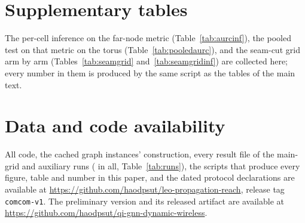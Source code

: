 \documentclass[preprint,11pt,3p]{elsarticle}
\begin{document}
\appendix
\section{Supplementary tables}
\label{app:tables}
The per-cell inference on the far-node metric (Table~\ref{tab:aurcinf}), the pooled test on that
metric on the torus (Table~\ref{tab:pooledaurc}), and the seam-cut grid arm by arm
(Tables~\ref{tab:seamgrid} and~\ref{tab:seamgridinf}) are collected here; every number in them is
produced by the same script as the tables of the main text.

\begin{table}[H]
\centering
\caption{Grid 2, far-node error at 1000 epochs, submitted capacity: paired inference across
seeds for each arm-level cell, with the same columns as Table~\ref{tab:grid3inf}: mean per-seed
difference $e_{\mathrm{heat}}-e_{\mathrm{walk}}$ on the far-node metric with its 95\% bootstrap
interval, exact sign-test $p$, exact Wilcoxon $p$, and the Wilcoxon $p$ Holm-corrected over the
\numGthreeArmCells{} cells of this table; the constant predictor for each cell is in
Table~\ref{tab:aurc}. The pooled form of rule~6 on this metric is in Table~\ref{tab:pooledaurc}.}
\label{tab:aurcinf}

\end{table}

\begin{table}[H]
\centering
\caption{Grid 2, far-node error: the pooled form of rule~6, one test per (task, shell), with
the columns of Table~\ref{tab:pooled}.}
\label{tab:pooledaurc}

\end{table}

\begin{table}[H]
\centering
\caption{Seam-cut graph, MAE at 1000 epochs, submitted capacity, every $t$ arm, with the columns
of Table~\ref{tab:grid3}.}
\label{tab:seamgrid}

\end{table}

\begin{table}[H]
\centering
\caption{Seam-cut graph, MAE: paired inference across seeds for each arm-level cell, with the
columns of Table~\ref{tab:grid3inf}; Holm correction over the \numSeamArmCells{} cells of this
table.}
\label{tab:seamgridinf}

\end{table}


\section*{Data and code availability}
All code, the cached graph instances' construction, every result file of the
\numTotalRuns{} main-grid and \numAuxRuns{} auxiliary runs (\numGrandRuns{} in all, Table~\ref{tab:runs}), the scripts that produce every figure, table
and number in this paper, and the dated protocol declarations are available at
\url{https://github.com/haodpsut/leo-propagation-reach}, release tag \texttt{comcom-v1}. The preliminary version and its
released artifact are available at \url{https://github.com/haodpsut/qi-gnn-dynamic-wireless}.
\end{document}
